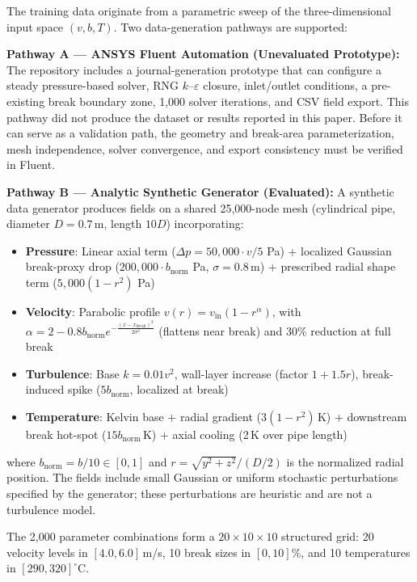 \documentclass[journal]{IEEEtran}
\newcommand{\added}[1]{#1}
\begin{document}
The training data originate from a parametric sweep of the three-dimensional input space $(v, b, T)$. Two data-generation pathways are supported:

\textbf{\added{Pathway A --- ANSYS Fluent Automation (Unevaluated Prototype):}}
\added{The repository includes a journal-generation prototype that can configure a steady pressure-based solver, RNG $k$--$\varepsilon$ closure, inlet/outlet conditions, a pre-existing break boundary zone, 1,000 solver iterations, and CSV field export. This pathway did not produce the dataset or results reported in this paper. Before it can serve as a validation path, the geometry and break-area parameterization, mesh independence, solver convergence, and export consistency must be verified in Fluent.}

\textbf{\added{Pathway B --- Analytic Synthetic Generator (Evaluated):}}
A synthetic data generator produces fields on a shared 25,000-node mesh (cylindrical pipe, diameter $D = 0.7$\,m, length $10D$) incorporating:
\begin{itemize}
    \item \added{\textbf{Pressure}: Linear axial term ($\Delta p = 50{,}000 \cdot v/5$ Pa) + localized Gaussian break-proxy drop ($200{,}000 \cdot b_\text{norm}$ Pa, $\sigma = 0.8$\,m) + prescribed radial shape term ($5{,}000(1-r^2)$ Pa)}
    \item \textbf{Velocity}: Parabolic profile $v(r) = v_\text{in}(1 - r^{\alpha})$, with $\alpha = 2 - 0.8 b_\text{norm} e^{-\frac{(x - x_\text{break})^2}{2\sigma^2}}$ (flattens near break) and 30\% reduction at full break
    \item \textbf{Turbulence}: Base $k = 0.01 v^2$, wall-layer increase (factor $1 + 1.5r$), break-induced spike ($5 b_\text{norm}$, localized at break)
    \item \textbf{Temperature}: Kelvin base + radial gradient ($3(1-r^2)$\,K) + downstream break hot-spot ($15 b_\text{norm}$\,K) + axial cooling (2\,K over pipe length)
\end{itemize}
where $b_\text{norm} = b/10 \in [0,1]$ and $r = \sqrt{y^2 + z^2}/(D/2)$ is the normalized radial position. \added{The fields include small Gaussian or uniform stochastic perturbations specified by the generator; these perturbations are heuristic and are not a turbulence model.}

The 2,000 parameter combinations form a $20 \times 10 \times 10$ structured grid: 20 velocity levels in $[4.0, 6.0]$\,m/s, 10 break sizes in $[0, 10]$\%, and 10 temperatures in $[290, 320]^\circ$C.
\end{document}
